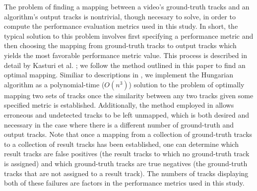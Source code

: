 \documentclass[twocolumn, final]{svjour3}
\begin{document}
The problem of finding a mapping between a video's ground-truth tracks and an algorithm's output tracks is nontrivial, though necesary to solve, in order to compute the performance evaluation metrics used in this study. In short, the typical solution to this problem involves first specifying a performance metric and then choosing the mapping from ground-truth tracks to output tracks which yields the most favorable performance metric value. This process is described in detail by Kasturi et al. \cite{kasturi_2008}; we follow the method outlined in this paper to find an optimal mapping. Similiar to descriptions in \cite{kasturi_2008}, we implement the Hungarian algorithm \cite{munkres_1957} as a polynomial-time ($O(n^{3})$) solution to the problem of optimally mapping two sets of tracks once the similarity between any two tracks given some specified metric is established. Additionally, the method employed in \cite{kasturi_2008} allows erroneous and undetected tracks to be left unmapped, which is both desired and necessary in the case where there is a different number of ground-truth and output tracks. Note that once a mapping from a collection of ground-truth tracks to a collection of result tracks has been established, one can determine which result tracks are false positives (the result tracks to which no ground-truth track is assigned) and which ground-truth tracks are true negatives (the ground-truth tracks that are not assigned to a result track). The numbers of tracks displaying both of these failures are factors in the performance metrics used in this study.




\end{document}
